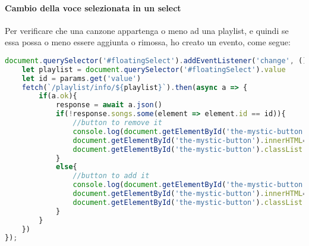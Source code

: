 \paragraph{Cambio della voce selezionata in un select} Per verificare che una canzone appartenga o meno ad una playlist, e quindi se essa possa o meno essere aggiunta o rimossa, ho creato un evento, come segue:
\begin{lstlisting}[language=JavaScript]
document.querySelector('#floatingSelect').addEventListener('change', () =>{
    let playlist = document.querySelector('#floatingSelect').value
    let id = params.get('value')
    fetch(`/playlist/info/${playlist}`).then(async a => {
        if(a.ok){
            response = await a.json()
            if(!response.songs.some(element => element.id == id)){
                //button to remove it
                console.log(document.getElementById('the-mystic-button').onclick)
                document.getElementById('the-mystic-button').innerHTML='Add it!'
                document.getElementById('the-mystic-button').classList.add('text-bg-success')
            }
            else{
                //button to add it
                console.log(document.getElementById('the-mystic-button').onclick)
                document.getElementById('the-mystic-button').innerHTML='Remove it!'
                document.getElementById('the-mystic-button').classList.add('text-bg-danger')
            }
        }
    })
});
\end{lstlisting}
\newpage